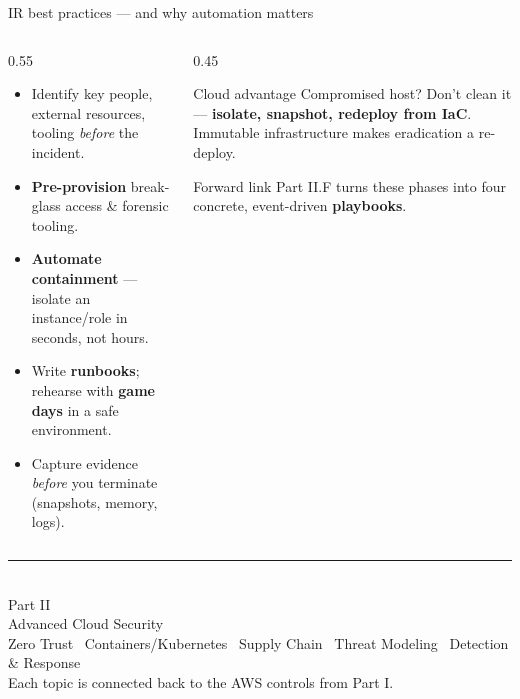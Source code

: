 \documentclass[aspectratio=169,10pt]{beamer}
\newcommand{\term}[1]{{\color{awsink}\textbf{#1}}}
\begin{document}
\begin{frame}{IR best practices --- and why automation matters}
  \begin{columns}[T]
    \begin{column}{0.55\textwidth}\small
      \begin{itemize}
        \item Identify key people, external resources, tooling \emph{before} the incident.
        \item \term{Pre-provision} break-glass access \& forensic tooling.
        \item \term{Automate containment} --- isolate an instance/role in seconds, not hours.
        \item Write \term{runbooks}; rehearse with \term{game days} in a safe environment.
        \item Capture evidence \emph{before} you terminate (snapshots, memory, logs).
      \end{itemize}
    \end{column}
    \begin{column}{0.45\textwidth}
      \begin{block}{\footnotesize Cloud advantage}
        \footnotesize Compromised host? Don't clean it --- \term{isolate, snapshot, redeploy from IaC}.
        Immutable infrastructure makes eradication a re-deploy.
      \end{block}
      \begin{block}{\footnotesize Forward link}
        \footnotesize Part II.F turns these phases into four concrete, event-driven
        \term{playbooks}.
      \end{block}
    \end{column}
  \end{columns}
\end{frame}


\begin{frame}
  \vfill\centering
  {\color{awsorange}\rule{0.25\paperwidth}{2.5pt}}\\[0.8em]
  {\color{awsink}Part II}\\[0.4em]
  {\Large\color{awsink}Advanced Cloud Security}\\[0.6em]
  {\color{midgray}\small Zero Trust \textbullet\ Containers/Kubernetes \textbullet\ Supply Chain
   \textbullet\ Threat Modeling \textbullet\ Detection \& Response}\\[0.8em]
  {\footnotesize\color{midgray}Each topic is connected back to the AWS controls from Part I.}
  \vfill
\end{frame}
\end{document}
